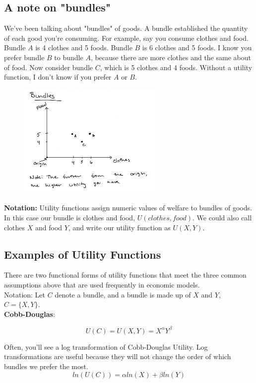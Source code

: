 \documentclass{article}
\begin{document}
\subsection{A note on "bundles"}
We've been talking about "bundles" of goods. A bundle established the quantity of each good you're consuming. For example, say you consume clothes and food. Bundle $A$ is 4 clothes and 5 foods. Bundle $B$ is 6 clothes and 5 foods. I know you prefer bundle $B$ to bundle $A$, because there are more clothes and the same about of food. Now consider bundle $C$, which is 5 clothes and 4 foods. Without a utility function, I don't know if you prefer $A$ or $B$.\\

\begin{figure}[htp]
    \centering
    \includegraphics[width=7cm]{Screen Shot 2023-02-13 at 3.40.02 PM.png}
    \caption{}
\end{figure}


\textbf{Notation:} Utility functions assign numeric values of welfare to bundles of goods. In this case our bundle is clothes and food, $U(clothes, food)$. We could also call clothes $X$ and food $Y$, and write our utility function as $U(X,Y)$. 
 
\subsection{Examples of Utility Functions}
There are two functional forms of utility functions that meet the three common assumptions above that are used frequently in economic models. \\

Notation: Let $C$ denote a bundle, and a bundle is made up of $X$ and $Y$, $C = \{X, Y\}.$\\

\textbf{Cobb-Douglas}:

$$U(C) = U(X,Y) = X^\alpha Y^\beta$$

Often, you'll see a log transformation of Cobb-Douglas Utility. Log transformations are useful because they will not change the order of which bundles we prefer the most.
$$ln(U(C)) = \alpha ln(X) + \beta ln(Y)$$
\end{document}
